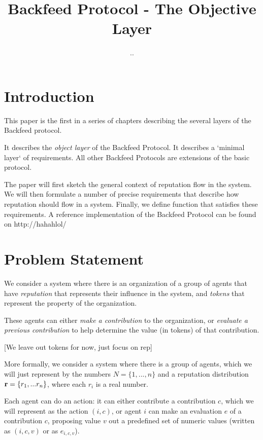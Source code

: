 \documentclass{article}
\begin{document}
\title{Backfeed Protocol - The Objective Layer}
\author{..}
\date{}
\maketitle

\tableofcontents

\section{Introduction}

This paper is the first in a series of chapters describing the several layers of the Backfeed protocol. 

It describes the {\em object layer} of the Backfeed Protocol. It describes a `minimal layer` of requirements. All other Backfeed Protocols are extensions of the basic protocol.

The paper will first sketch the general context of reputation flow in the system. 
We will then formulate a number of precise requirements that describe how reputation should flow in a system. Finally, we define function that satisfies these requirements. 
A reference implementation of the Backfeed Protocol can be found on http://hahahlol/

\section{Problem Statement}

We consider a system where there is an organization of a group of agents that have {\em reputation} that represents their influence in the system, and {\em tokens} that represent the property of the organization.

These agents can either {\em make a contribution} to the organization, or {\em evaluate a previous contribution} to help determine the value (in tokens) of that contribution. 


[We leave out tokens for now, just focus on rep]

More formally, we consider a system where there is a group of agents, which we will just represent by the numbers $N = \{1, ... , n\}$ and a reputation distribution ${\bf r} = \{r_1, ... r_n\}$, where each $r_i$ is a real number.
 
Each agent can do an action: it can either contribute a contribution $c$, which we will represent as the action $(i, c)$, or agent $i$ can make an evaluation $e$ of a contribution $c$, proposing value $v$ out a predefined set of numeric values (written as $(i,c,v)$ or as $e_{i,c,v}$).
\end{document}
